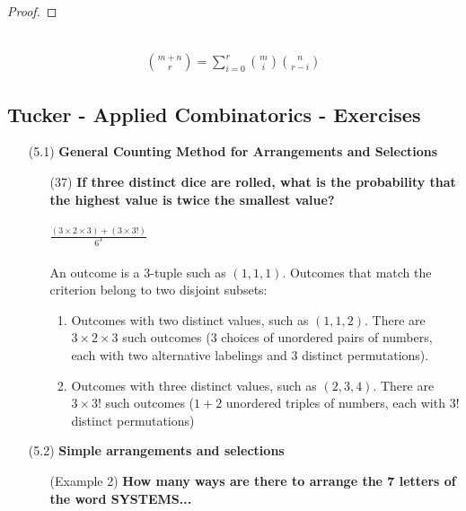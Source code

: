 \begin{proof}
\end{proof}


\begin{theorem*}[Identities]~\\
  \begin{align*}
    {m + n \choose r} = \sum_{i=0}^r {m \choose i}{n \choose r - i}
  \end{align*}
\end{theorem*}

\subsection{Tucker - Applied Combinatorics - Exercises}

\begin{enumerate}
\item[(5.1)] {\bf General Counting Method for Arrangements and Selections}
  \begin{enumerate}
  \item[(37)] {\bf If three distinct dice are rolled, what is the probability that the highest
      value is
      twice the smallest value?}\\~\\
    $\frac{(3 \times 2 \times 3) + (3 \times 3!)}{6^3}$\\~\\
    An outcome is a 3-tuple such as $(1,1,1)$. Outcomes that match the criterion belong to two
    disjoint subsets:
    \begin{enumerate}
    \item Outcomes with two distinct values, such as $(1,1,2)$. There are $3 \times 2 \times 3$
      such outcomes ($3$ choices of unordered pairs of numbers, each with two alternative labelings
      and $3$ distinct permutations).
    \item Outcomes with three distinct values, such as $(2,3,4)$. There are $3 \times 3!$ such
      outcomes ($1 + 2$ unordered triples of numbers, each with $3!$ distinct permutations)
    \end{enumerate}
  \end{enumerate}
  \newpage
\item[(5.2)] {\bf Simple arrangements and selections}
  \begin{enumerate}
  \item[(Example 2)] {\bf How many ways are there to arrange the 7 letters of the word SYSTEMS...}
    \begin{enumerate}

\end{enumerate}
\end{enumerate}
\end{enumerate}

